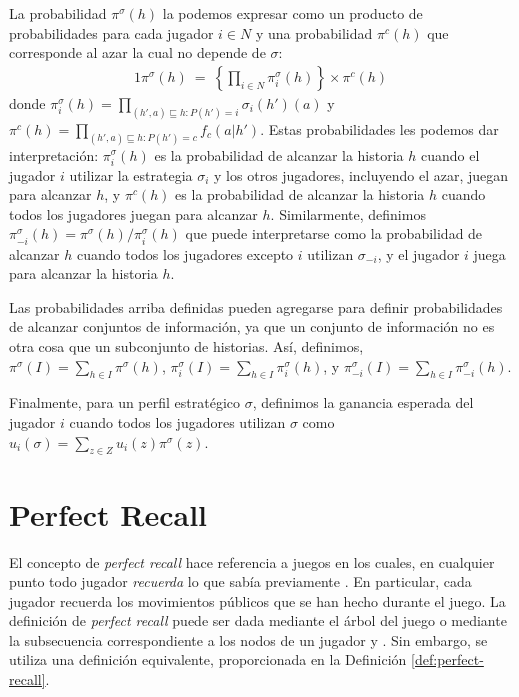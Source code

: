 La probabilidad $\pi^\sigma(h)$ la podemos expresar como un producto de probabilidades para cada jugador $i\in N$ y una probabilidad $\pi^c(h)$ que corresponde al azar la cual no depende de $\sigma$:
\begin{alignat}{1}
  \pi^\sigma(h)\ =\ \left\{\prod_{i\in N} \pi^\sigma_i(h)\right\} \times \pi^c(h)
\end{alignat}
donde $\pi^\sigma_i(h) = \prod_{(h',a)\sqsubseteq h : P(h')=i} \sigma_i(h')(a)$ y $\pi^c(h)=\prod_{(h',a)\sqsubseteq h : P(h')=c} f_c(a|h')$. Estas probabilidades les podemos dar interpretación: $\pi^\sigma_i(h)$ es la probabilidad de alcanzar la historia $h$ cuando el jugador $i$ utilizar la estrategia $\sigma_i$ y los otros jugadores, incluyendo el azar, juegan para alcanzar $h$, y $\pi^c(h)$ es la probabilidad de alcanzar la historia $h$ cuando todos los jugadores juegan para alcanzar $h$. Similarmente, definimos $\pi^\sigma_{-i}(h)=\pi^\sigma(h) / \pi^\sigma_i(h)$ que puede interpretarse como la probabilidad de alcanzar $h$ cuando todos los jugadores excepto $i$ utilizan $\sigma_{-i}$, y el jugador $i$ juega para alcanzar la historia $h$.

Las probabilidades arriba definidas pueden agregarse para definir probabilidades de alcanzar conjuntos de información, ya que un conjunto de información no es otra cosa que un subconjunto de historias. Así, definimos, 
$\pi^\sigma(I)=\sum_{h\in I}\pi^\sigma(h)$, $\pi^\sigma_i(I)=\sum_{h\in I}\pi^\sigma_i(h)$, y $\pi^\sigma_{-i}(I)=\sum_{h\in I}\pi^\sigma_{-i}(h)$.


Finalmente, para un perfil estratégico $\sigma$, definimos la ganancia esperada del jugador $i$ cuando todos los jugadores utilizan $\sigma$ como $u_i(\sigma) = \sum_{z \in Z} u_i(z)\pi^\sigma(z)$. 

\section{Perfect Recall}

El concepto de \textit{perfect recall} hace referencia a juegos en los cuales, en cualquier punto todo jugador \textit{recuerda} lo que sabía previamente \cite[p.~203]{bib:course-game-theory}. En particular, cada jugador recuerda los movimientos públicos que se han hecho durante el juego. La definición de \textit{perfect recall} puede ser dada mediante el árbol del juego \cite{bib:conceptos-basicos} o mediante la subsecuencia correspondiente a los nodos de un jugador \cite[p.~203]{bib:course-game-theory} y \cite[p.~44]{bib:handbook-blai}. Sin embargo, se utiliza una definición equivalente, proporcionada en la Definición \ref{def:perfect-recall}.

